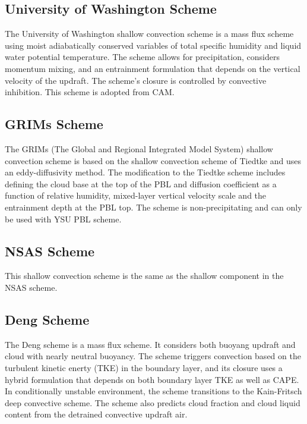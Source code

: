 \subsection{University of Washington Scheme}

The University of Washington shallow convection scheme is a mass flux scheme \citep{park09} using moist 
adiabatically conserved variables of total specific humidity and liquid water potential 
temperature. The scheme allows for precipitation, considers momentum mixing, and an entrainment 
formulation that depends on the vertical velocity of the updraft. The scheme's closure is 
controlled by convective inhibition. This scheme is adopted from CAM.

\subsection{GRIMs Scheme}

The GRIMs (The Global and Regional Integrated Model System) shallow convection scheme \citep{hong18} is based 
on the shallow convection scheme of Tiedtke and uses an eddy-diffusivity method. The modification 
to the Tiedtke scheme includes defining the cloud base at the top of the PBL and diffusion 
coefficient as a function of relative humidity, mixed-layer vertical velocity scale and the 
entrainment depth at the PBL top. The scheme is non-precipitating and can only be used with YSU PBL scheme.

\subsection{NSAS Scheme}

This shallow convection scheme is the same as the shallow component in the NSAS scheme.

\subsection{Deng Scheme}

The Deng scheme \citep{deng03} is a mass flux scheme. It considers both buoyang updraft and cloud with nearly neutral buoyancy.
The scheme triggers convection based on the turbulent kinetic enerty (TKE) in the boundary layer, and its closure uses a
hybrid formulation that depends on both boundary layer TKE as well as CAPE.
In conditionally unstable environment, the scheme transitions to the Kain-Fritsch deep convective scheme.
The scheme also predicts cloud fraction and cloud liquid content from the detrained convective updraft air.

